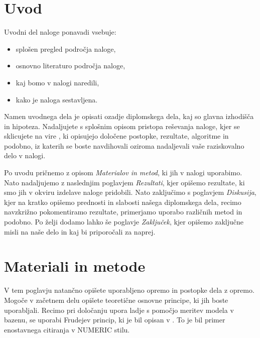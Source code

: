 \documentclass[pomnav,SMER=splošna]{fppthesis}
\begin{document}
	
	
\section{Uvod}
\label{sec:Uvod}

Uvodni del naloge ponavadi vsebuje:

\begin{itemize}[nosep]
	\item splošen pregled področja naloge,
	\item osnovno literaturo področja naloge,
	\item kaj bomo v nalogi naredili,
	\item kako je naloga sestavljena.
\end{itemize}

Namen uvodnega dela je opisati ozadje diplomskega dela, kaj so glavna izhodišča in hipoteza. Nadaljujete s splošnim opisom pristopa reševanja naloge, kjer se sklicujete na vire \cite{molland2017ship, lang}, ki opisujejo določene postopke, rezultate, algoritme in podobno, iz katerih se boste navdihovali oziroma nadaljevali vaše raziskovalno delo v nalogi.

Po uvodu pričnemo z opisom \textit{Materialov in metod}, ki jih v nalogi uporabimo. Nato nadaljujemo z naslednjim poglavjem \textit{Rezultati}, kjer opišemo rezultate, ki smo jih v okviru izdelave naloge pridobili. Nato zaključimo s poglavjem \textit{Diskusija}, kjer na kratko opišemo prednosti in slabosti našega diplomskega dela, recimo navzkrižno pokomentiramo rezultate, primerjamo uporabo različnih metod in podobno. Po želji dodamo lahko še poglavje \textit{Zaključek}, kjer opišemo zaključne misli na naše delo in kaj bi priporočali za naprej.


\newpage
\section{Materiali in metode}
\label{sec:Materiali}

V tem poglavju natančno opišete uporabljeno opremo in postopke dela z opremo. Mogoče v začetnem delu opišete teoretične osnovne principe, ki jih boste uporabljali. Recimo pri določanju upora ladje s pomočjo meritev modela v bazenu, se uporabi Frudejev princip, ki je bil opisan v \cite{froude1888resistance}. To je bil primer enostavnega citiranja v NUMERIC stilu.
\end{document}
